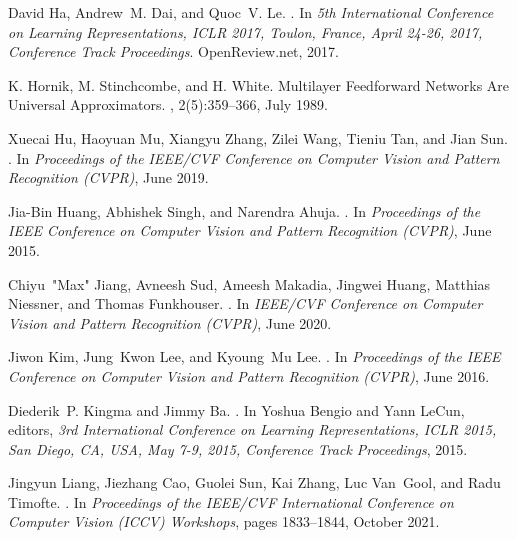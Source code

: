 \documentclass[10pt,twocolumn,letterpaper]{article}
\begin{document}
{\begin{thebibliography}{10}
David Ha, Andrew~M. Dai, and Quoc~V. Le.
.
\newblock In {\em 5th International Conference on Learning Representations,
  {ICLR} 2017, Toulon, France, April 24-26, 2017, Conference Track
  Proceedings}. OpenReview.net, 2017.

K. Hornik, M. Stinchcombe, and H. White.
\newblock Multilayer {F}eedforward {N}etworks {A}re {U}niversal
  {A}pproximators.
, 2(5):359–366, July 1989.

Xuecai Hu, Haoyuan Mu, Xiangyu Zhang, Zilei Wang, Tieniu Tan, and Jian Sun.
.
\newblock In {\em Proceedings of the IEEE/CVF Conference on Computer Vision and
  Pattern Recognition (CVPR)}, June 2019.

Jia-Bin Huang, Abhishek Singh, and Narendra Ahuja.
.
\newblock In {\em Proceedings of the IEEE Conference on Computer Vision and
  Pattern Recognition (CVPR)}, June 2015.

Chiyu~"Max" Jiang, Avneesh Sud, Ameesh Makadia, Jingwei Huang, Matthias
  Niessner, and Thomas Funkhouser.
.
\newblock In {\em IEEE/CVF Conference on Computer Vision and Pattern
  Recognition (CVPR)}, June 2020.

Jiwon Kim, Jung~Kwon Lee, and Kyoung~Mu Lee.
.
\newblock In {\em Proceedings of the IEEE Conference on Computer Vision and
  Pattern Recognition (CVPR)}, June 2016.

Diederik~P. Kingma and Jimmy Ba.
.
\newblock In Yoshua Bengio and Yann LeCun, editors, {\em 3rd International
  Conference on Learning Representations, {ICLR} 2015, San Diego, CA, USA, May
  7-9, 2015, Conference Track Proceedings}, 2015.

Jingyun Liang, Jiezhang Cao, Guolei Sun, Kai Zhang, Luc Van~Gool, and Radu
  Timofte.
.
\newblock In {\em Proceedings of the IEEE/CVF International Conference on
  Computer Vision (ICCV) Workshops}, pages 1833--1844, October 2021.


\end{thebibliography}}
\end{document}
